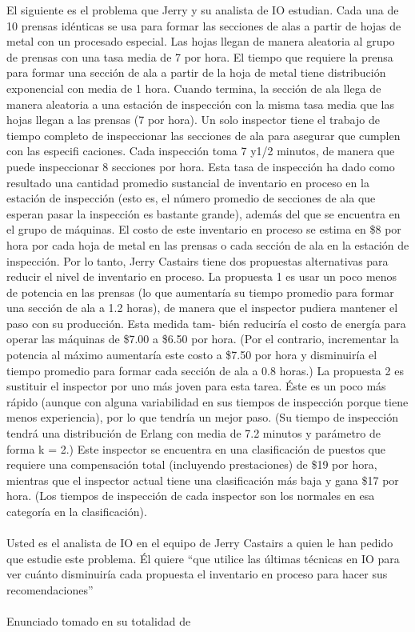 \documentclass{article}
\begin{document}
El siguiente es el problema que Jerry y su analista de IO
estudian. Cada una de 10 prensas idénticas se usa para formar
las secciones de alas a partir de hojas de metal con un procesado
especial. Las hojas llegan de manera aleatoria al grupo de prensas
con una tasa media de 7 por hora. El tiempo que requiere la
prensa para formar una sección de ala a partir de la hoja de metal
tiene distribución exponencial con media de 1 hora. Cuando termina,
la sección de ala llega de manera aleatoria a una estación
de inspección con la misma tasa media que las hojas llegan a las
prensas (7 por hora). Un solo inspector tiene el trabajo de tiempo
completo de inspeccionar las secciones de ala para asegurar
que cumplen con las especifi caciones. Cada inspección toma 7
y1/2 minutos, de manera que puede inspeccionar 8 secciones
por hora. Esta tasa de inspección ha dado como resultado una
cantidad promedio sustancial de inventario en proceso en la
estación de inspección (esto es, el número promedio de secciones
de ala que esperan pasar la inspección es bastante grande),
además del que se encuentra en el grupo de máquinas.
El costo de este inventario en proceso se estima en \$8 por
hora por cada hoja de metal en las prensas o cada sección de ala
en la estación de inspección. Por lo tanto, Jerry Castairs tiene
dos propuestas alternativas para reducir el nivel de inventario
en proceso.
La propuesta 1 es usar un poco menos de potencia en las
prensas (lo que aumentaría su tiempo promedio para formar
una sección de ala a 1.2 horas), de manera que el inspector
pudiera mantener el paso con su producción. Esta medida tam-
bién reduciría el costo de energía para operar las máquinas
de \$7.00 a \$6.50 por hora. (Por el contrario, incrementar la
potencia al máximo aumentaría este costo a \$7.50 por hora y
disminuiría el tiempo promedio para formar cada sección de
ala a 0.8 horas.)
La propuesta 2 es sustituir el inspector por uno más joven para
esta tarea. Éste es un poco más rápido (aunque con alguna variabilidad
en sus tiempos de inspección porque tiene menos experiencia), por
lo que tendría un mejor paso. (Su tiempo de inspección tendrá una
distribución de Erlang con media de 7.2 minutos y parámetro de 
forma k = 2.) Este inspector se encuentra en una clasificación
de puestos que requiere una compensación total (incluyendo prestaciones)
de \$19 por hora, mientras que el inspector actual tiene una 
clasificación más baja y gana \$17 por hora. (Los tiempos de 
inspección de cada inspector son los normales en esa categoría en 
la clasificación). \\\\
Usted es el analista de IO en el 
equipo de Jerry Castairs a quien le han pedido que estudie este
problema. Él quiere ``que utilice las últimas técnicas
en IO para ver cuánto disminuiría cada propuesta el 
inventario en proceso para hacer sus recomendaciones''
\\\\Enunciado tomado en su totalidad de \cite[p.~800]{libroIO2}
\end{document}
